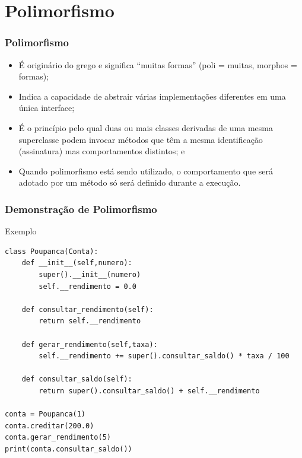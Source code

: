 \documentclass{beamer}
\begin{document}
\section{Polimorfismo}

\begin{frame}
	\frametitle{Polimorfismo}
	
	\begin{itemize}
	  \item É originário do grego e significa ``muitas formas'' (poli = muitas,
	  morphos = formas);
	  \item Indica a capacidade de abstrair várias implementações diferentes em uma
	  única interface;
	  \item É o princípio pelo qual duas ou mais classes derivadas de uma mesma
	  superclasse podem invocar métodos que têm a mesma identificação (assinatura)
	  mas comportamentos distintos; e
	  \item Quando polimorfismo está sendo utilizado, o comportamento que será
	  adotado por um método só será definido durante a execução.
	\end{itemize}
\end{frame}

\begin{frame}[fragile]
	\frametitle{Demonstração de Polimorfismo}
		
	\begin{exampleblock}{Exemplo}
	   \begin{lstlisting}
class Poupanca(Conta):
    def __init__(self,numero):
        super().__init__(numero)
        self.__rendimento = 0.0
    
    def consultar_rendimento(self):
        return self.__rendimento

    def gerar_rendimento(self,taxa):
        self.__rendimento += super().consultar_saldo() * taxa / 100

    def consultar_saldo(self):
        return super().consultar_saldo() + self.__rendimento

conta = Poupanca(1)
conta.creditar(200.0)
conta.gerar_rendimento(5)
print(conta.consultar_saldo())
       \end{lstlisting}
	\end{exampleblock}
\end{frame}
\end{document}
